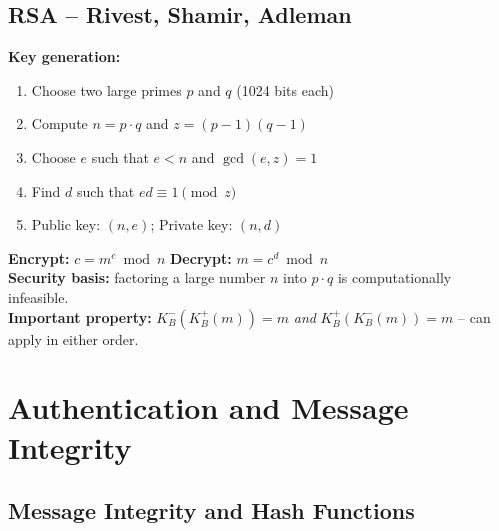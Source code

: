 \subsection{RSA -- Rivest, Shamir, Adleman}

\begin{tcolorbox}[formulabox, title=RSA -- How It Works]
\textbf{Key generation:}
\begin{enumerate}[noitemsep]
  \item Choose two large primes $p$ and $q$ (1024 bits each)
  \item Compute $n = p \cdot q$ and $z = (p-1)(q-1)$
  \item Choose $e$ such that $e < n$ and $\gcd(e,z) = 1$
  \item Find $d$ such that $ed \equiv 1 \pmod{z}$
  \item Public key: $(n, e)$; Private key: $(n, d)$
\end{enumerate}
\textbf{Encrypt:} $c = m^e \bmod n$ \quad \textbf{Decrypt:} $m = c^d \bmod n$\\[4pt]
\textbf{Security basis:} factoring a large number $n$ into $p \cdot q$ is computationally infeasible.\\[4pt]
\textbf{Important property:} $K_B^-(K_B^+(m)) = m$ \textit{and} $K_B^+(K_B^-(m)) = m$ -- can apply in either order.
\end{tcolorbox}

\begin{imagebox}
\end{imagebox}

\section{Authentication and Message Integrity}

\subsection{Message Integrity and Hash Functions}

